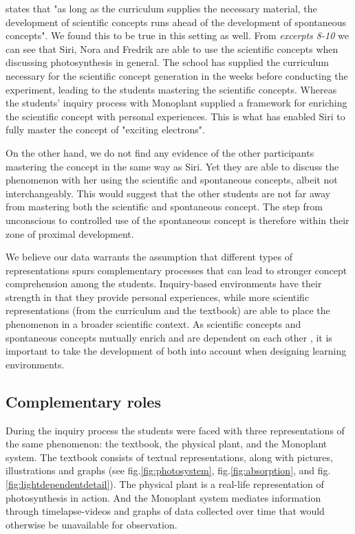 \citet{vygotsky2012thought} states that "as long as the curriculum supplies the necessary material, the development of scientific concepts runs ahead of the development of spontaneous concepts". We found this to be true in this setting as well. From \emph{excerpts 8-10} we can see that Siri, Nora and Fredrik are able to use the scientific concepts when discussing photosynthesis in general. The school has supplied the curriculum necessary for the scientific concept generation in the weeks before conducting the experiment, leading to the students mastering the scientific concepts. Whereas the students' inquiry process with Monoplant supplied a framework for enriching the scientific concept with personal experiences. This is what has enabled Siri to fully master the concept of "exciting electrons".  

On the other hand, we do not find any evidence of the other participants mastering the concept in the same way as Siri. Yet they are able to discuss the phenomenon with her using the scientific and spontaneous concepts, albeit not interchangeably. This would suggest that the other students are not far away from mastering both the scientific and spontaneous concept. The step from unconscious to controlled use of the spontaneous concept is therefore within their zone of proximal development. 

We believe our data warrants the assumption that different types of representations spurs complementary processes that can lead to stronger concept comprehension among the students. Inquiry-based environments have their strength in that they provide personal experiences, while more scientific representations (from the curriculum and the textbook) are able to place the phenomenon in a broader scientific context. As scientific concepts and spontaneous concepts mutually enrich and are dependent on each other \citep{vygotsky2012thought}, it is important to take the development of both into account when designing learning environments. 

\subsection{Complementary roles}
During the inquiry process the students were faced with three representations of the same phenomenon: the textbook, the physical plant, and the Monoplant system. The textbook consists of textual representations, along with pictures, illustrations and graphs (see fig.\ref{fig:photosystem}, fig.\ref{fig:absorption}, and fig.\ref{fig:lightdependentdetail}). The physical plant is a real-life representation of photosynthesis in action. And the Monoplant system mediates information through timelapse-videos and graphs of data collected over time that would otherwise be unavailable for observation.  

